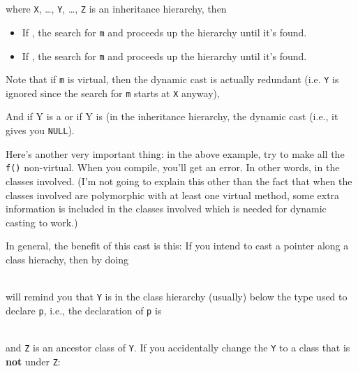 \begin{consolethree}[escapeinside=||]
\\
\\

where \texttt{X}, \ldots, \texttt{Y}, \ldots, \texttt{Z} is an inheritance hierarchy, then

\begin{itemize}
\item
  If , the search for \texttt{m}  and proceeds up the hierarchy until it's found.
\item
  If , the search for \texttt{m}  and proceeds up the hierarchy until it's found.
\end{itemize}

Note that if \texttt{m} is virtual, then the dynamic cast is actually redundant (i.e. \texttt{Y} is ignored since the search for \texttt{m} starts
at \texttt{X} anyway),

And if Y is a  or if Y is  (in the inheritance hierarchy, the dynamic cast  (i.e., it gives you \texttt{NULL}).

Here's another very important thing: in the above example, try to make all the \texttt{f()} non-virtual. When you compile, you'll get an error. In other words,  in the classes involved. (I'm not going to explain this other than the fact that when the classes involved are polymorphic with at least one virtual method, some extra information is included in the classes involved which is needed for dynamic casting to work.)

In general, the benefit of this cast is this: If you intend to cast a
pointer along a class hierachy, then by doing

\\

will remind you that \texttt{Y} is in the class hierarchy (usually) below the type used to declare \texttt{p}, i.e., the declaration of \texttt{p} is

\\

and \texttt{Z} is an ancestor class of \texttt{Y}. If you accidentally change the \texttt{Y} to a class that is \textbf{not} under \texttt{Z}:


\end{consolethree}
